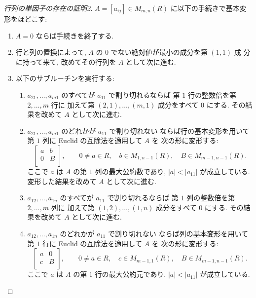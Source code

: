 \documentclass[12pt,twoside]{jarticle}
\begin{document}
\begin{proof}[行列の単因子の存在の証明2]
$A=[a_{ij}]\in M_{m,n}(R)$ に以下の手続きで基本変形をほどこす:
\begin{enumerate}
\item $A=0$ ならば手続きを終了する.
\item 行と列の置換によって, $A$ の $0$ でない絶対値が最小の成分を第 $(1,1)$ 成
  分に持って来て, 改めてその行列を $A$ として次に進む.
\item 以下のサブルーチンを実行する:
  \begin{enumerate}
  \item $a_{21},\dots,a_{m1}$ のすべてが $a_{11}$ で割り切れるならば
    第 $1$ 行の整数倍を第 $2,\dots,m$ 行に
    加えて第 $(2,1),\dots,(m,1)$ 成分をすべて $0$ にする.
    その結果を改めて $A$ として次に進む.
  \item $a_{21},\dots,a_{m1}$ のどれかが $a_{11}$ で割り切れない
    ならば行の基本変形を用いて第 $1$ 列に Euclid の互除法を適用して $A$ を
    次の形に変形する:
    \begin{equation*}
      \begin{bmatrix}
        a & b \\
        0 & B \\
      \end{bmatrix},
      \qquad
      0\ne a\in R,\quad
      b\in M_{1,n-1}(R),\quad 
      B\in M_{m-1,n-1}(R).
    \end{equation*}
    ここで $a$ は $A$ の第 $1$ 列の最大公約数であり, 
    $|a|<|a_{11}|$ が成立している.
    変形した結果を改めて $A$ として次に進む.
  \item $a_{12},\dots,a_{1n}$ のすべてが $a_{11}$ で割り切れるならば
    第 $1$ 列の整数倍を第 $2,\dots,m$ 列に
    加えて第 $(1,2),\dots,(1,n)$ 成分をすべて $0$ にする.
    その結果を改めて $A$ として次に進む.
  \item $a_{12},\dots,a_{1n}$ のどれかが $a_{11}$ で割り切れない
    ならば列の基本変形を用いて第 $1$ 行に Euclid の互除法を適用して $A$ を
    次の形に変形する:
    \begin{equation*}
      \begin{bmatrix}
        a & 0 \\
        c & B \\
      \end{bmatrix},
      \qquad
      0\ne a\in R,\quad
      c\in M_{m-1,1}(R),\quad 
      B\in M_{m-1,n-1}(R).
    \end{equation*}
    ここで $a$ は $A$ の第 $1$ 行の最大公約元であり, 
    $|a|<|a_{11}|$ が成立している.

\end{enumerate}
\end{enumerate}
\end{proof}
\end{document}
